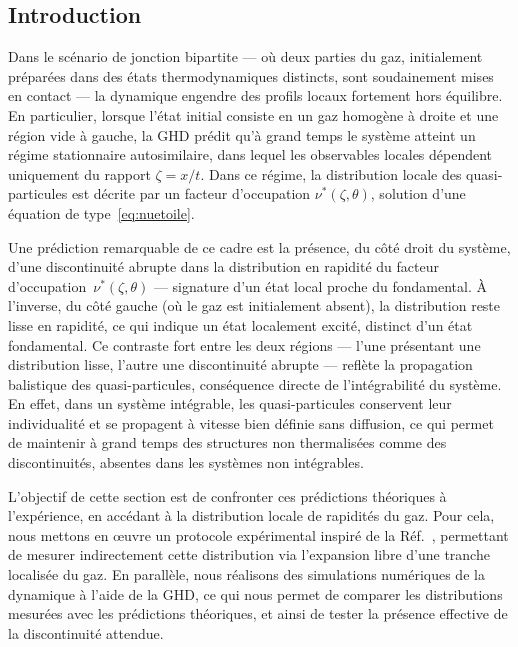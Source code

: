 \subsection*{Introduction}

Dans le scénario de jonction bipartite — où deux parties du gaz, initialement préparées dans des états thermodynamiques distincts, sont soudainement mises en contact — la dynamique engendre des profils locaux fortement hors équilibre. En particulier, lorsque l’état initial consiste en un gaz homogène à droite et une région vide à gauche, la GHD prédit qu’à grand temps le système atteint un régime stationnaire autosimilaire, dans lequel les observables locales dépendent uniquement du rapport $\zeta = x/t$. Dans ce régime, la distribution locale des quasi-particules est décrite par un facteur d’occupation $\nu^*(\zeta,\theta)$, solution d’une équation de type~\eqref{eq:nuetoile}.

\medskip

Une prédiction remarquable de ce cadre est la présence, du côté droit du système, d’une discontinuité abrupte dans la distribution en rapidité du facteur d’occupation~$\nu^*(\zeta,\theta)$ — signature d’un état local proche du fondamental. À l’inverse, du côté gauche (où le gaz est initialement absent), la distribution reste lisse en rapidité, ce qui indique un état localement excité, distinct d’un état fondamental. Ce contraste fort entre les deux régions — l’une présentant une distribution lisse, l’autre une discontinuité abrupte — reflète la propagation balistique des quasi-particules, conséquence directe de l’intégrabilité du système. En effet, dans un système intégrable, les quasi-particules conservent leur individualité et se propagent à vitesse bien définie sans diffusion, ce qui permet de maintenir à grand temps des structures non thermalisées comme des discontinuités, absentes dans les systèmes non intégrables.

\medskip

L’objectif de cette section est de confronter ces prédictions théoriques à l’expérience, en accédant à la distribution locale de rapidités du gaz. Pour cela, nous mettons en œuvre un protocole expérimental inspiré de la Réf.~\cite{dubois_probing_2024}, permettant de mesurer indirectement cette distribution via l’expansion libre d’une tranche localisée du gaz. En parallèle, nous réalisons des simulations numériques de la dynamique à l’aide de la GHD, ce qui nous permet de comparer les distributions mesurées avec les prédictions théoriques, et ainsi de tester la présence effective de la discontinuité attendue.


